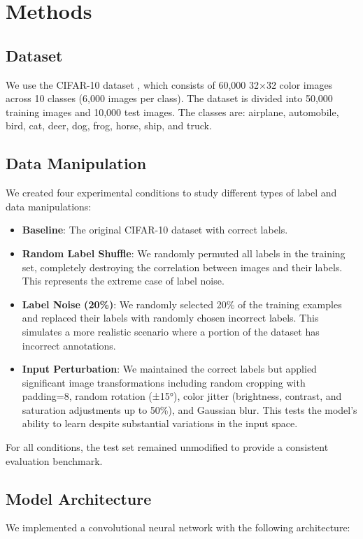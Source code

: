\documentclass[10pt,twocolumn,letterpaper]{article}
\begin{document}
\section{Methods}
\label{sec:methods}

\subsection{Dataset}
We use the CIFAR-10 dataset \cite{krizhevsky2009learning}, which consists of 60,000 32$\times$32 color images across 10 classes (6,000 images per class).
The dataset is divided into 50,000 training images and 10,000 test images.
The classes are: airplane, automobile, bird, cat, deer, dog, frog, horse, ship, and truck.

\subsection{Data Manipulation}
We created four experimental conditions to study different types of label and data manipulations:

\begin{itemize}
    \item \textbf{Baseline}: The original CIFAR-10 dataset with correct labels.
    \item \textbf{Random Label Shuffle}: We randomly permuted all labels in the training set, completely destroying the correlation between images and their labels. This represents the extreme case of label noise.
    \item \textbf{Label Noise (20\%)}: We randomly selected 20\% of the training examples and replaced their labels with randomly chosen incorrect labels. This simulates a more realistic scenario where a portion of the dataset has incorrect annotations.
    \item \textbf{Input Perturbation}: We maintained the correct labels but applied significant image transformations including random cropping with padding=8, random rotation (±15°), color jitter (brightness, contrast, and saturation adjustments up to 50\%), and Gaussian blur. This tests the model's ability to learn despite substantial variations in the input space.
\end{itemize}

For all conditions, the test set remained unmodified to provide a consistent evaluation benchmark.

\subsection{Model Architecture}
We implemented a convolutional neural network with the following architecture:
\end{document}
